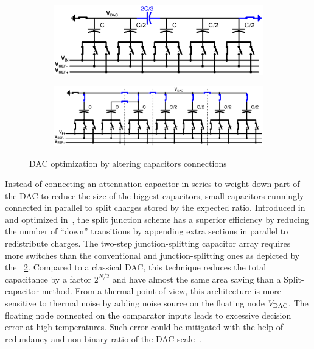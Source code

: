 \begin{figure}[htp]
	\centering
	\begin{subfigure}[b]{0.46\textwidth}
        \includegraphics[width=\textwidth]{Chapter3/Figs/sar_split_cap_dac.ps}
        \label{fig:split_capacitor}
    \end{subfigure}
    \begin{subfigure}[b]{0.52\textwidth}
        \includegraphics[width=\textwidth]{Chapter3/Figs/sar_split_junction_dac.ps}
        \label{fig:split_junction}
    \end{subfigure}
	\caption{DAC optimization by altering capacitors connections}
	\label{fig:sar_split_dac}
\end{figure}

Instead of connecting an attenuation capacitor in series to weight down part of the DAC to reduce the size of the biggest capacitors, small capacitors cunningly connected in parallel to split charges stored by the expected ratio. Introduced in~\cite{Lee2008} and optimized in~\cite{Yu2010}, the split junction scheme has a superior efficiency by reducing the number of ``down'' transitions by appending extra sections in parallel to redistribute charges. The two-step junction-splitting capacitor array requires more switches than the conventional and junction-splitting ones as depicted by the \figurename~\ref{fig:split_junction}. Compared to a classical DAC, this technique reduces the total capacitance by a factor \(2^{N/2}\) and have almost the same area saving than a Split-capacitor method. From a thermal point of view, this architecture is more sensitive to thermal noise by adding noise source on the floating node \(V_{\rm DAC}\). The floating node connected on the comparator inputs leads to excessive decision error at high temperatures. Such error could be mitigated with the help of redundancy and non binary ratio of the DAC scale~\cite{Zhang2014}.

